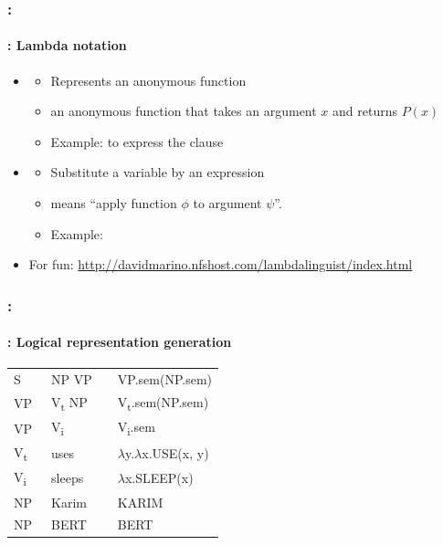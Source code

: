 \documentclass[xcolor=table]{beamer}
\begin{document}
\begin{frame}
	\frametitle{\insertshortsubtitle: \insertsection}
	\framesubtitle{\insertsubsection: Lambda notation}
	
	\begin{itemize}
		\item {}
		\begin{itemize}
			\item Represents an anonymous function
			\item {} an anonymous function that takes an argument $x$ and returns $P(x)$
			\item Example:  to express the clause 
		\end{itemize}
		
		\item {}
		\begin{itemize}
			\item Substitute a variable by an expression
			\item \keyword{$ \phi(\psi) $} means ``apply function $\phi$ to argument $\psi$''.
			\item Example: 
		\end{itemize}
		
		\item For fun: \url{http://davidmarino.nfshost.com/lambdalinguist/index.html}
	\end{itemize}
	
\end{frame}

\begin{frame}
	\frametitle{\insertshortsubtitle: \insertsection}
	\framesubtitle{\insertsubsection: Logical representation generation}
	
	\begin{center}
		\small
		\begin{tabular}{llll}
			\hline\hline
			S  & \textrightarrow\ NP VP && VP.sem(NP.sem) \\
			VP & \textrightarrow\ V\textsubscript{t} NP && V\textsubscript{t}.sem(NP.sem)\\
			VP & \textrightarrow\ V\textsubscript{i} && V\textsubscript{i}.sem \\
			V\textsubscript{t}  & \textrightarrow\ uses && $ \lambda $y.$ \lambda $x.USE(x, y) \\
			V\textsubscript{i}  & \textrightarrow\ sleeps && $ \lambda $x.SLEEP(x) \\
			NP  & \textrightarrow\  Karim && KARIM \\
			NP  & \textrightarrow\  BERT && BERT \\
			\hline\hline
		\end{tabular}
		
	\end{center}
\end{frame}
\end{document}
